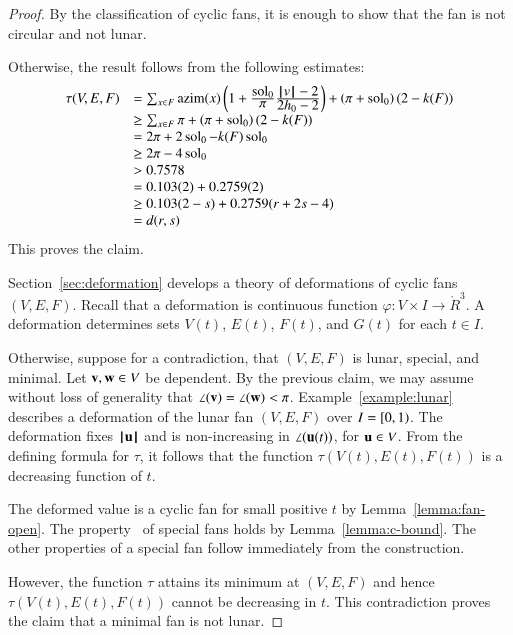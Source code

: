 \begin{proof}
By the classification of cyclic fans, it is enough to show that the fan is not circular and not lunar.

  Otherwise,
the result follows from the following estimates:
$$
\begin{array}{lll}
\tau(V,E,F) &=\sum_{x\in F} {\operatorname{azim}}(x)\left(1 + \frac{\displaystyle \operatorname{sol}_0}{\displaystyle \pi}  \frac{\displaystyle {{\hskip0.1em|\hskip-0.15em|\hskip0.1em}v{\hskip0.1em|\hskip-0.15em|\hskip0.1em}}-2}{\displaystyle 2{h_0}-2}\right) + \left(\pi+{\operatorname{sol}_0}\right) (2- k(F))\\
 &\ge \sum_{x\in F} \pi + \left(\pi+{\operatorname{sol}_0}\right) (2- k(F))\\
 &= 2\pi + 2\operatorname{sol}_0 - k(F) \operatorname{sol}_0\\
 &\ge 2\pi - 4\operatorname{sol}_0\\
&> 0.7578\\
&=0.103 (2) + 0.2759 (2)\\
&\ge 0.103 (2-s) + 0.2759 (r+2s-4) \\ 
&= d(r,s)\\
\end{array}
$$
This proves the claim.


Section~\ref{sec:deformation} develops a theory of deformations of cyclic fans $(V,E,F)$.  Recall that a deformation is  continuous function $\varphi:V\times I\to\ring{R}^3$.  A deformation determines sets $V(t)$, $E(t)$, $F(t)$, and $G(t)$ for each $t\in I$.


  Otherwise,
suppose for a contradiction, that $(V,E,F)$ is lunar, special, and
minimal.  Let ${\mathbf v},{\mathbf w}\in V$ be dependent.   By the previous claim, we may assume without loss of generality that $\angle({\mathbf v})=\angle({\mathbf w})<\pi$.   Example~\ref{example:lunar} describes a deformation of the lunar fan $(V,E,F)$
over $I=[0,1)$.  The deformation fixes ${{\hskip0.1em|\hskip-0.15em|\hskip0.1em}{\mathbf u}{\hskip0.1em|\hskip-0.15em|\hskip0.1em}}$
and is non-increasing in $\angle({\mathbf u}(t))$, for ${\mathbf u}\in V$.
From the defining formula for $\tau$, it follows that the function $\tau(V(t),E(t),F(t))$ is a decreasing function of $t$.

   The deformed value is a cyclic fan for small positive $t$ by Lemma~\ref{lemma:fan-open}.   The property~ of special fans holds by Lemma~\ref{lemma:c-bound}.  The other properties of a special fan follow immediately from the construction. 

However, the function $\tau$ attains its minimum at $(V,E,F)$ and hence
$\tau(V(t),E(t),F(t))$ cannot be decreasing in $t$.  This contradiction proves the claim that a minimal fan is not lunar.
\end{proof}

